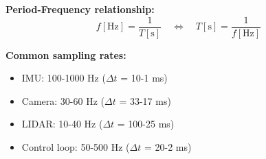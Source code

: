 \textbf{Period-Frequency relationship:}
\begin{equation}
f[\text{Hz}] = \frac{1}{T[\text{s}]} \quad \Leftrightarrow \quad T[\text{s}] = \frac{1}{f[\text{Hz}]}
\end{equation}

\textbf{Common sampling rates:}
\begin{itemize}
    \item IMU: 100-1000 Hz ($\Delta t$ = 10-1 ms)
    \item Camera: 30-60 Hz ($\Delta t$ = 33-17 ms)
    \item LIDAR: 10-40 Hz ($\Delta t$ = 100-25 ms)
    \item Control loop: 50-500 Hz ($\Delta t$ = 20-2 ms)
\end{itemize}




